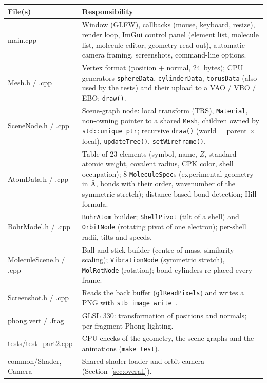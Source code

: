 \documentclass[a4paper, 11pt]{article}
\newcommand{\code}[1]{\texttt{#1}}
\begin{document}
\begin{center}
\small
\begin{tabularx}{\textwidth}{@{}>{\ttfamily}l X@{}}
\toprule
\textnormal{\textbf{File(s)}} & \textbf{Responsibility}\\
\midrule
main.cpp & Window (GLFW), callbacks (mouse, keyboard, resize), render loop, ImGui control panel (element list, molecule list,
           molecule editor, geometry read-out), automatic camera framing, screenshots, command-line options.\\
Mesh.h / .cpp & Vertex format (position + normal, 24~bytes); CPU generators \code{sphereData}, \code{cylinderData}, \code{torusData}
           (also used by the tests) and their upload to a VAO / VBO / EBO; \code{draw()}.\\
SceneNode.h / .cpp & Scene-graph node: local transform (TRS), \code{Material}, non-owning pointer to a shared \code{Mesh}, children owned by
           \code{std::unique\_ptr}; recursive \code{draw()} (world = parent $\times$ local), \code{updateTree()}, \code{setWireframe()}.\\
AtomData.h / .cpp & Table of 23 elements (symbol, name, $Z$, standard atomic weight, covalent radius, CPK color, shell occupation);
           8 \code{MoleculeSpec}s (experimental geometry in {\AA}, bonds with their order, wavenumber of the symmetric stretch);
           distance-based bond detection; Hill formula.\\
BohrModel.h / .cpp & \code{BohrAtom} builder; \code{ShellPivot} (tilt of a shell) and \code{OrbitNode} (rotating pivot of one electron);
           per-shell radii, tilts and speeds.\\
MoleculeScene.h / .cpp & Ball-and-stick builder (centre of mass, similarity scaling); \code{VibrationNode} (symmetric stretch),
           \code{MolRotNode} (rotation); bond cylinders re-placed every frame.\\
Screenshot.h / .cpp & Reads the back buffer (\code{glReadPixels}) and writes a PNG with \code{stb\_image\_write}~\cite{stb}.\\
phong.vert / .frag & GLSL 330: transformation of positions and normals; per-fragment Phong lighting.\\
tests/test\_part2.cpp & CPU checks of the geometry, the scene graphs and the animations (\code{make test}).\\
common/Shader, Camera & Shared shader loader and orbit camera (Section~\ref{sec:overall}).\\
\bottomrule
\end{tabularx}
\end{center}
\end{document}
